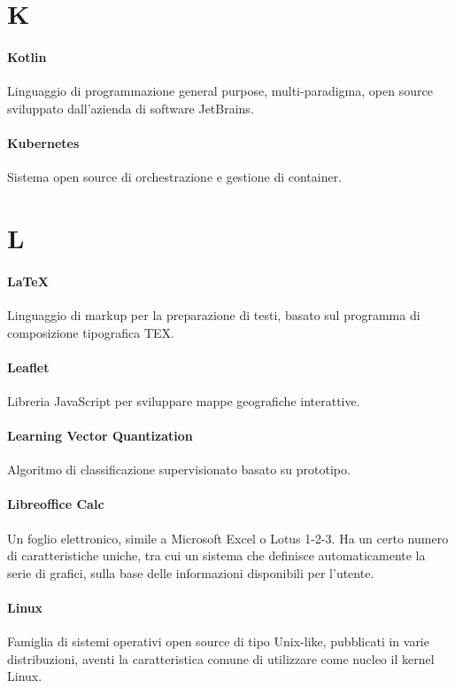 \documentclass[]{article}
\begin{document}
	\section*{K}
	
	\paragraph*{Kotlin}
	Linguaggio di programmazione general purpose, multi-paradigma, open source sviluppato dall'azienda di software JetBrains.
	
	\paragraph*{Kubernetes}
	Sistema open source di orchestrazione e gestione di container.
	
	\newpage
	
	\section*{L}
	
	\paragraph*{LaTeX}
	Linguaggio di markup per la preparazione di testi, basato sul programma di composizione tipografica TEX.
	
	\paragraph*{Leaflet}
	Libreria JavaScript per sviluppare mappe geografiche interattive.
	
	\paragraph*{Learning Vector Quantization}
	Algoritmo di classificazione supervisionato basato su prototipo.
	
	\paragraph*{Libreoffice Calc}
	Un foglio elettronico, simile a Microsoft Excel o Lotus 1-2-3. Ha un certo numero di caratteristiche uniche, tra cui un sistema che definisce automaticamente la serie di grafici, sulla base delle informazioni disponibili per l'utente.
	
	\paragraph*{Linux}
	Famiglia di sistemi operativi open source di tipo Unix-like, pubblicati in varie distribuzioni, aventi la caratteristica comune di utilizzare come nucleo il kernel Linux.
	
\end{document}
